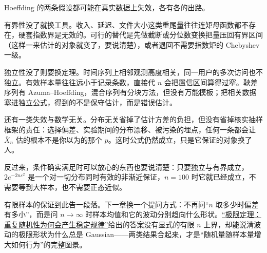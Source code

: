 Hoeffding 的两条假设都可能在真实数据上失效，各有各的出路。

有界性没了就换工具。收入、延迟、文件大小这类重尾量往往连矩母函数都不存在，硬套指数界是无效的。可行的替代是先做截断或分位数变换把量压回有界区间（这样一来估计的对象就变了，要说清楚），或者退回不需要指数矩的 Chebyshev 一级。

独立性没了则要换定理。时间序列上相邻观测高度相关，同一用户的多次访问也不独立。有效样本量往往远小于记录条数，直接代 \(n\) 会把置信区间算得过窄。鞅差序列有 Azuma--Hoeffding，混合序列有分块方法，但没有万能模板；把相关数据塞进独立公式，得到的不是保守估计，而是错误估计。

还有一类失效与数学无关。分布无关省掉了估计方差的负担，但没有省掉核实抽样框架的责任：选择偏差、实验期间的分布漂移、被污染的埋点，任何一条都会让 \(\bar X_n\) 估的根本不是你以为的那个 \(p\)。这时公式仍然成立，只是它保证的对象换了人。

反过来，条件确实满足时可以放心的东西也要说清楚：只要独立与有界成立，\(2e^{-2n\varepsilon^2}\) 是一个对一切分布同时有效的非渐近保证，\(n=100\) 时它就已经成立，不需要等到大样本，也不需要正态近似。

有限样本的保证到此告一段落。下一章换一个提问方式：不再问``\(n\) 取多少时偏差有多小''，而是问 \(n\to\infty\) 时样本均值和它的波动分别趋向什么形状。\hyperref[ch:044]{``极限定理：重复随机性为何会产生稳定规律''}给出的答案没有显式的有限 \(n\) 上界，却能说清波动的极限形状为什么总是 Gaussian——两类结果合起来，才是``随机量随样本量增大如何行为''的完整图景。
